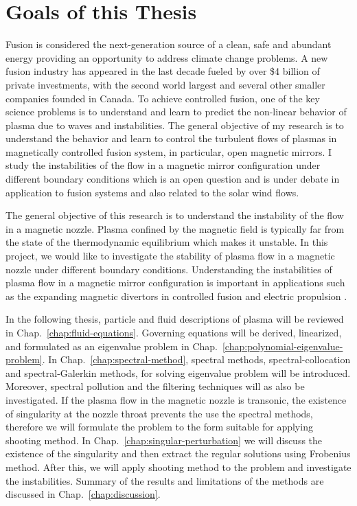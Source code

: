 \section{Goals of this Thesis}
Fusion is considered the next-generation source of a clean, safe and abundant energy providing an opportunity to address climate change problems. A new fusion industry has appeared in the last decade fueled by over \$4 billion of private investments, with the second world largest and several other smaller companies founded in Canada. To achieve controlled fusion, one of the key science problems is to understand and learn to predict the non-linear behavior of plasma due to waves and instabilities. The general objective of my research is to understand the behavior and learn to control the turbulent flows of plasmas in magnetically controlled fusion system, in particular, open magnetic mirrors. I study the instabilities of the flow in a magnetic mirror configuration under different boundary conditions which is an open question and is under debate in application to fusion systems and also related to the solar wind flows.

The general objective of this research is to understand the instability of the flow in a magnetic nozzle. Plasma confined by the magnetic field is typically far from the state of the thermodynamic equilibrium which makes it unstable. In this project, we would like to investigate the stability of plasma flow in a magnetic nozzle under different boundary conditions. Understanding the instabilities of plasma flow in a magnetic mirror configuration is important in applications such as the expanding magnetic divertors in controlled fusion and electric propulsion \cite{ryutov_divertor_2016,kaganovich_2020_physics}.

In the following thesis, particle and fluid descriptions of plasma will be reviewed in Chap.~\ref{chap:fluid-equations}. Governing equations will be derived, linearized, and formulated as an eigenvalue problem in Chap.~\ref{chap:polynomial-eigenvalue-problem}. In Chap.~\ref{chap:spectral-method}, spectral methods, spectral-collocation and spectral-Galerkin methods, for solving eigenvalue problem will be introduced.  Moreover, spectral pollution and the filtering techniques will as also be investigated. If the plasma flow in the magnetic nozzle is transonic, the existence of singularity at the nozzle throat prevents the use the spectral methods, therefore we will formulate the problem to the form suitable for applying shooting method. In Chap.~\ref{chap:singular-perturbation} we will discuss the existence of the singularity and then extract the regular solutions using Frobenius method. After this, we will apply shooting method to the problem and investigate the instabilities. Summary of the results and limitations of the methods are discussed in Chap.~\ref{chap:discussion}.

